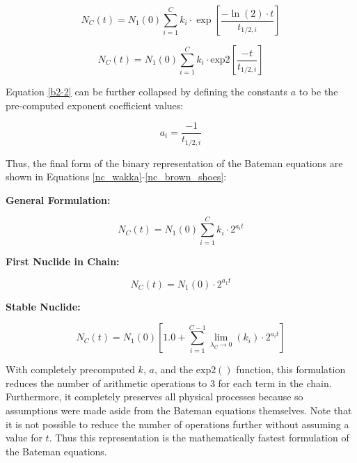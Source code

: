 \documentclass{anstrans}
\begin{document}
\begin{equation}
\label{b2-1}
N_C(t) = N_1(0) \sum_{i=1}^C k_{i} \cdot \exp\left[\frac{-\ln(2)\cdot t}{t_{1/2,i}}\right]
\end{equation}

\begin{equation}
\label{b2-2}
N_C(t) = N_1(0) \sum_{i=1}^C k_{i} \cdot \mathrm{exp2}\left[\frac{-t}{t_{1/2,i}}\right]
\end{equation}

Equation \ref{b2-2} can be further collapsed by defining the constants $a$ to 
be the pre-computed exponent coefficient values:

\begin{equation}
\label{a_i}
a_i = \frac{-1}{t_{1/2,i}}
\end{equation}

Thus, the final form of the binary representation of the Bateman equations 
are shown in Equations \ref{nc_wakka}-\ref{nc_brown_shoes}:

\textbf{General Formulation:}

\begin{equation}
\label{nc_wakka}
N_C(t) = N_1(0) \sum_{i=1}^C k_{i} \cdot 2^{a_i t}
\end{equation}

\textbf{First Nuclide in Chain:}

\begin{equation}
\label{nc_jawakka}
N_C(t) = N_1(0) \cdot 2^{a_1 t}
\end{equation}

\textbf{Stable Nuclide:}

\begin{equation}
\label{nc_brown_shoes}
N_C(t) = N_1(0) \left[1.0 + \sum_{i=1}^{C-1} \lim_{\lambda_C\to 0}(k_{i}) \cdot 2^{a_i t} \right]
\end{equation}

With completely precomputed $k$, $a$, and the $\mathrm{exp2}()$ function, this 
formulation reduces the number of arithmetic operations to 3 for each term 
in the chain. Furthermore, it completely preserves all physical processes 
because so assumptions were made aside from the Bateman equations themselves.
Note that it is not possible to reduce the number of operations further
without assuming a value for $t$. Thus this representation is the 
mathematically fastest formulation of the Bateman equations.
\end{document}
